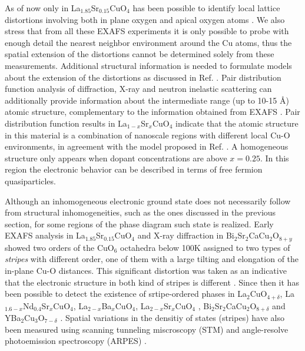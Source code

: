 As of now only in La$_{1.85}$Sr$_{0.15}$CuO$_{4}$ has been possible to identify local lattice distortions involving both in plane oxygen and apical oxygen atoms  \cite{Bianconi1996}. 
We also stress that from all these EXAFS experiments it is only possible to probe with enough detail the nearest neighbor environment around the Cu atoms, thus the spatial extension of the distortions cannot be determined solely from these measurements. 
Additional structural information \cite{Bianconi1996a} is needed to formulate models about the extension of the distortions as discussed in Ref. \cite{Bianconi1996}.
Pair distribution function analysis of diffraction, X-ray and neutron inelastic scattering can additionally provide information about the intermediate range (up to 10-15 \AA) atomic structure, complementary to the information obtained from EXAFS \cite{Egami2003}. 
Pair distribution function results in La$_{1-x}$Sr$_{x}$CuO$_{4}$ \cite{Bozin1999,Bozin2000} indicate that the atomic structure in this material is a combination of nanoscale regions with different local Cu-O environments, in agreement with the model proposed in Ref. \cite{Bianconi1996}. 
A homogeneous structure only appears when dopant concentrations are above $x = 0.25$. 
In this region the electronic behavior can be described in terms of free fermion quasiparticles.

Although an inhomogeneous electronic ground state does not necessarily follow from structural inhomogeneities, such as the ones discussed in the previous section, for some regions of the phase diagram such state is realized.
Early EXAFS analysis in La$_{1.85}$Sr$_{0.15}$CuO$_4$ and X-ray diffraction in Bi$_2$Sr$_2$CaCu$_2$O$_{8+y}$ showed two orders of the CuO$_6$ octahedra below 100K assigned to two types of \textit{stripes} with different order, one of them with a large tilting and elongation of the in-plane Cu-O distances.
This significant distortion was taken as an indicative that the electronic structure in both kind of stripes is different \cite{Bianconi1996,Bianconi1996a}.
Since then it has been possible to detect the existence of srtipe-ordered phases in La$_2$CuO$_{4+\delta}$, La$_{1.6-x}$Nd$_{0.4}$Sr$_x$CuO$_4$, La$_{2-x}$Ba$_x$CuO$_4$, La$_{2-x}$Sr$_x$CuO$_4$ \cite{Kivelson2003}, Bi$_2$Sr$_2$CaCu$_2$O$_{8+\delta}$ \cite{Poccia2011a} and YBa$_2$Cu$_3$O$_{7-\delta}$ \cite{Mook2002,Haase2003}.
Spatial variations in the densitiy of states (stripes) have also been measured using scanning tunneling miscroscopy (STM) \cite{Pan2001} and angle-resolve photoemission spectroscopy (ARPES) \cite{Salkola1996}. 


